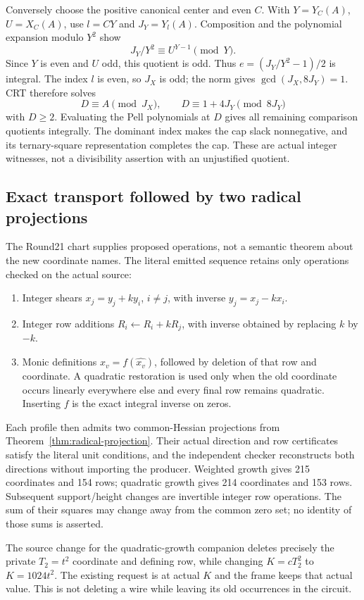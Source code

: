 Conversely choose the positive canonical center and even $C$. With
$Y=Y_C(A)$, $U=X_C(A)$, use $l=CY$ and $J_Y=Y_l(A)$.
Composition and the polynomial expansion modulo $Y^2$ show
\[
 J_Y/Y^2\equiv U^{Y-1}\pmod Y.
\]
Since $Y$ is even and $U$ odd, this quotient is odd. Thus
$e=(J_Y/Y^2-1)/2$ is integral. The index $l$ is even, so $J_X$ is odd;
the norm gives $\gcd(J_X,8J_Y)=1$. CRT therefore solves
\[
 D\equiv A\pmod{J_X},\qquad D\equiv1+4J_Y\pmod{8J_Y}
\]
with $D\ge2$. Evaluating the Pell polynomials at $D$ gives all remaining
comparison quotients integrally. The dominant index makes the cap slack
nonnegative, and its ternary-square representation completes the cap.
These are actual integer witnesses, not a divisibility assertion with an
unjustified quotient.

\subsection{Exact transport followed by two radical projections}
The Round21 chart supplies proposed operations, not a semantic theorem
about the new coordinate names. The literal emitted sequence retains
only operations checked on the actual source:
\begin{enumerate}
\item Integer shears $x_j=y_j+ky_i$, $i\ne j$, with inverse
$y_j=x_j-kx_i$.
\item Integer row additions $R_i\leftarrow R_i+kR_j$, with inverse
obtained by replacing $k$ by $-k$.
\item Monic definitions $x_v=f(\widehat{x_v})$, followed by deletion of
that row and coordinate. A quadratic restoration is used only when the
old coordinate occurs linearly everywhere else and every final row
remains quadratic. Inserting $f$ is the exact integral inverse on zeros.
\end{enumerate}
Each profile then admits two common-Hessian projections from
Theorem~\ref{thm:radical-projection}. Their actual direction and row
certificates satisfy the literal unit conditions, and the independent
checker reconstructs both directions without importing the producer.
Weighted growth gives 215 coordinates and 154 rows; quadratic growth gives
214 coordinates and 153 rows. Subsequent support/height changes are
invertible integer row operations. The sum of their squares may change
away from the common zero set; no identity of those sums is asserted.

The source change for the quadratic-growth companion deletes precisely
the private $T_2=t^2$ coordinate and defining row, while changing
$K=cT_2^2$ to $K=1024t^2$. The existing request is at actual $K$ and
the frame keeps that actual value. This is not deleting a wire while
leaving its old occurrences in the circuit.

